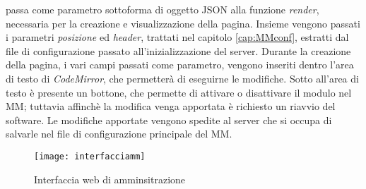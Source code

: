 passa come parametro sottoforma di oggetto JSON alla funzione \textit{render}, necessaria per la creazione e visualizzazione della pagina.
Insieme vengono passati i parametri \textit{posizione} ed \textit{header}, trattati nel capitolo \ref{cap:MMconf}, estratti dal file
di configurazione passato all'inizializzazione del server.
Durante la creazione della pagina, i vari campi passati come parametro, vengono inseriti dentro l'area di testo di \textit{CodeMirror}, che permetter\`a di eseguirne
le modifiche. Sotto all'area di testo \`e presente un bottone, che permette di attivare o disattivare il modulo nel MM; tuttavia affinch\`e la modifica
venga apportata \`e richiesto un riavvio del software. Le modifiche apportate vengono spedite al server che si occupa di salvarle nel file di configurazione
principale del MM.

\begin{figure}[H]
    \texttt{[image: interfacciamm]}
    \caption{Interfaccia web di amminsitrazione}
    \label{fig:interfaccia}
\end{figure}
